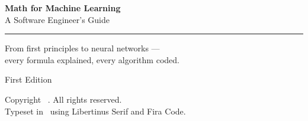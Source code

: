\documentclass[
  11pt,
  twoside,        %
  openright,      %
  final
]{book}
\begin{document}
\frontmatter

\begin{titlepage}
  \centering
  \vspace*{2.5cm}

  {\Huge\bfseries Math for Machine Learning}\\[0.8em]
  {\LARGE A Software Engineer's Guide}

  \vspace{1.5cm}
  \rule{0.5\textwidth}{0.4pt}
  \vspace{1.5cm}

  {\large
    From first principles to neural networks —\\[0.3em]
    every formula explained, every algorithm coded.
  }

  \vfill

  {\normalsize First Edition \\ \the\year}
\end{titlepage}

\thispagestyle{empty}
\vspace*{\fill}
\begin{small}
\noindent
Copyright \textcopyright\ \the\year.  All rights reserved.\\[1em]

\noindent
Typeset in \XeLaTeX\ using Libertinus Serif and Fira Code.
\end{small}
\vspace*{\fill}
\clearpage

\tableofcontents

\mainmatter

%
%
%


\backmatter
\end{document}
